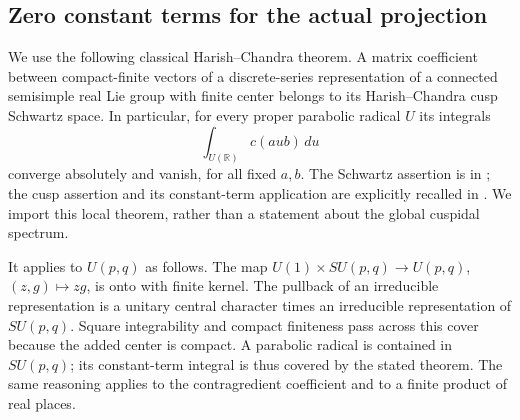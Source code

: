 \subsection{Zero constant terms for the actual projection}

We use the following classical Harish--Chandra theorem.
A matrix coefficient between compact-finite vectors
of a discrete-series representation of a connected
semisimple real Lie group with finite center belongs
to its Harish--Chandra cusp Schwartz space.  In particular,
for every proper parabolic radical \(U\) its integrals
\[
                   \int_{U(\mathbb R)}c(aub)\,du
\]
converge absolutely and vanish, for all fixed \(a,b\).
The Schwartz assertion is in
\cite[\S33, Lemma~65, Corollary~1]{harish-chandra-ds-ii};
the cusp assertion and its constant-term application
are explicitly recalled in
\cite[\S4.1]{khare-larsen-savin}.
We import this local theorem, rather than a statement
about the global cuspidal spectrum.

It applies to \(U(p,q)\) as follows.
The map \(U(1)\times SU(p,q)\to U(p,q)\),
\((z,g)\mapsto zg\), is onto with finite kernel.
The pullback of an irreducible representation is a
unitary central character times an irreducible
representation of \(SU(p,q)\).  Square integrability
and compact finiteness pass across this cover because
the added center is compact.  A parabolic radical
is contained in \(SU(p,q)\); its constant-term
integral is thus covered by the stated theorem.
The same reasoning applies to the contragredient
coefficient and to a finite product of real places.

